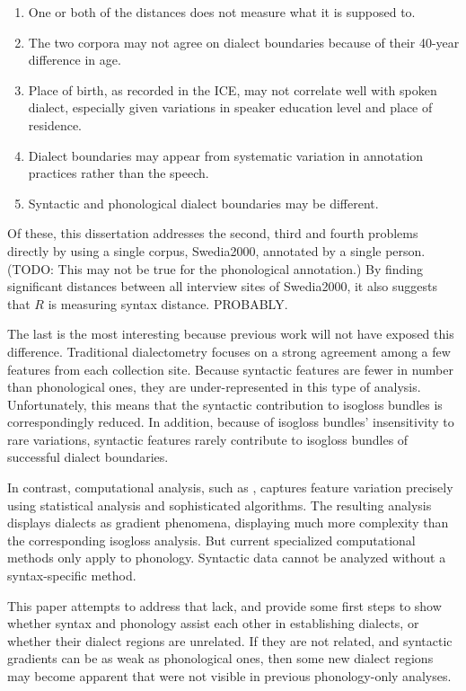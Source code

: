 \begin{enumerate}
\item One or both of the distances does not measure what it is supposed to.
\item The two corpora may not agree on dialect boundaries because of
  their 40-year difference in age.
\item Place of birth, as recorded in the ICE, may not correlate well
  with spoken dialect, especially given variations in speaker
  education level and place of residence.
\item Dialect boundaries may appear from systematic variation in
  annotation practices rather than the speech.
\item Syntactic and phonological dialect boundaries may be different.
\end{enumerate}

Of these, this dissertation addresses the second, third and fourth
problems directly by using a single corpus, Swedia2000, annotated by a single
person. (TODO: This may not be true for the phonological annotation.)
By finding significant distances between all interview sites of
Swedia2000, it also suggests that $R$ is measuring syntax
distance. PROBABLY.

The last is the most interesting because previous work will not have
exposed this difference. Traditional dialectometry focuses on a strong
agreement among a few features from each collection site. Because
syntactic features are fewer in number than phonological ones, they
are under-represented in this type of analysis. Unfortunately, this
means that the syntactic contribution to isogloss bundles is
correspondingly reduced. In addition, because of isogloss bundles'
insensitivity to rare variations, syntactic features rarely contribute
to isogloss bundles of successful dialect boundaries.

In contrast, computational analysis, such as \cite{shackleton07},
captures feature variation precisely using statistical analysis and
sophisticated algorithms. The resulting analysis displays dialects as
gradient phenomena, displaying much more complexity than the
corresponding isogloss analysis. But current specialized computational
methods only apply to phonology. Syntactic data cannot be analyzed
without a syntax-specific method.

This paper attempts to address that lack, and provide some first steps
to show whether syntax and phonology assist each other in establishing
dialects, or whether their dialect regions are unrelated. If they are not
related, and syntactic gradients can be as weak as phonological ones,
then some new dialect regions may become apparent that were not visible in
previous phonology-only analyses.

